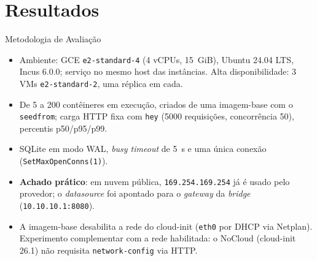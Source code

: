 \documentclass[aspectratio=169,xcolor=table]{beamer}
\begin{document}
\section{Resultados}
\sectionframe

\begin{frame}{Metodologia de Avaliação}
    \begin{itemize}
        \item Ambiente: GCE \texttt{e2-standard-4} (4 vCPUs, 15~GiB), Ubuntu 24.04
              LTS, Incus 6.0.0; serviço no mesmo host das instâncias.
              Alta disponibilidade: 3 VMs \texttt{e2-standard-2}, uma réplica em cada.
        \item De 5 a 200 contêineres em execução, criados de uma imagem-base com o
              \texttt{seedfrom}; carga HTTP fixa com \texttt{hey} (5000 requisições,
              concorrência 50), percentis p50/p95/p99.
        \item SQLite em modo WAL, \textit{busy timeout} de 5~s e uma única conexão
              (\texttt{SetMaxOpenConns(1)}).
        \item \textbf{Achado prático}: em nuvem pública, \texttt{169.254.169.254} já é
              usado pelo provedor; o \textit{datasource} foi apontado para o
              \textit{gateway} da \textit{bridge} (\texttt{10.10.10.1:8080}).
        \item A imagem-base desabilita a rede do cloud-init (\texttt{eth0} por DHCP
              via Netplan). Experimento complementar com a rede habilitada: o NoCloud
              (cloud-init 26.1) não requisita \texttt{network-config} via HTTP.
    \end{itemize}
\end{frame}
\end{document}
